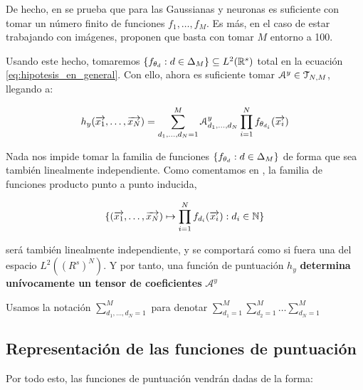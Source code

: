 De hecho, en \cite{matematicas:principal} se prueba que para las Gaussianas y neuronas es suficiente con tomar un número finito de funciones ${f_1, \ldots, f_M}$. Es más, en el caso de estar trabajando con imágenes, proponen que basta con tomar $M$ entorno a 100.

Usando este hecho, tomaremos $\{f_{\theta_d}: d \in \Delta_{M}\} \subseteq L^2(\mathbb{R}^s)$ total en la ecuación \eqref{eq:hipotesis_en_general}. Con ello, ahora es suficiente tomar $\mathcal{A}^y \in \mathcal{T}_{N, M}$, llegando a:

\begin{equation}
	h_y(\overrightarrow{x_1}, \ldots, \overrightarrow{x_N}) = \sum_{d_1, \ldots, d_N = 1}^{M} \mathcal{A}^y_{d_1, \ldots, d_N} \prod_{i = 1}^N f_{\theta_{d_i}}(\overrightarrow{x_i})
\end{equation}

\begin{observacion}

	Nada nos impide tomar la familia de funciones $\{f_{\theta_d}: d \in \Delta_{M}\}$ de forma que sea también linealmente independiente. Como comentamos en , la familia de funciones producto punto a punto inducida,

	\begin{equation}
		\{ (\overrightarrow{x_1}, \ldots, \overrightarrow{x_N}) \mapsto \prod_{i = 1}^N f_{d_i}(\overrightarrow{x_i}): d_i \in \mathbb{N} \}
	\end{equation}

	será también linealmente independiente, y se comportará como si fuera una  del espacio $L^2((R^s)^N)$. Y por tanto, una función de puntuación $h_y$ \textbf{determina unívocamente un tensor de coeficientes} $\mathcal{A}^y$

\end{observacion}

\begin{observacion}
	Usamos la notación $\sum_{d_1, \ldots, d_N = 1}^{M}$ para denotar $\sum_{d_1 = 1}^{M} \sum_{d_2 = 1}^{M} \ldots \sum_{d_N = 1}^{M}$
\end{observacion}

\subsection{Representación de las funciones de puntuación} \label{sec:repr_funciones_puntuacion}

Por todo esto, las funciones de puntuación vendrán dadas de la forma:

